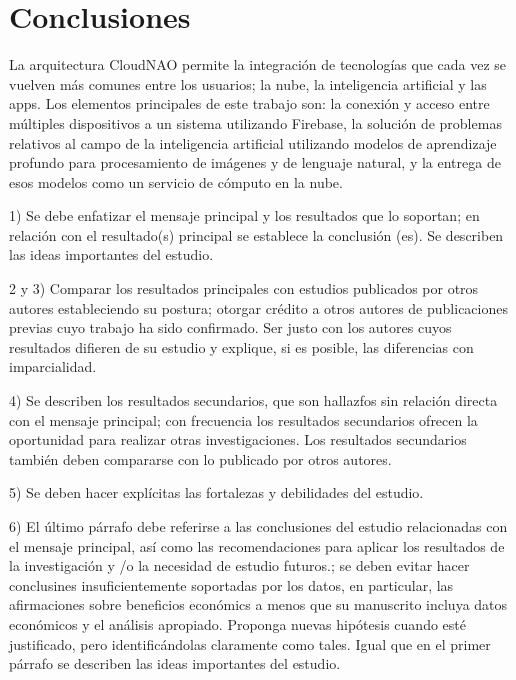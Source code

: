 \chapter*{Conclusiones}
\label{\detokenize{conclusion:cloudnao-una-arquitectura-de-software-para-la-integracion-de-computo-en-la-nube-con-robots-nao}}\label{\detokenize{conclusion:conclusion}}\label{\detokenize{conclusion::doc}}


La arquitectura CloudNAO permite
la integración de tecnologías que cada vez se vuelven
más comunes entre los usuarios; la nube, la inteligencia artificial
y las apps. 
Los elementos principales de este 
trabajo son: la conexión y acceso
entre múltiples dispositivos a un	 sistema
utilizando Firebase, la solución de problemas relativos al campo 
de la inteligencia artificial utilizando modelos
de aprendizaje profundo para procesamiento de imágenes y de lenguaje natural, 
y la entrega de esos modelos como un servicio de cómputo en la nube.



1) Se debe enfatizar el mensaje principal y los
resultados que lo soportan; en relación con el resultado(s) 
principal se establece la conclusión (es). Se describen
las ideas importantes del estudio.

2 y 3) Comparar los resultados principales  con estudios
publicados por otros autores estableciendo su postura;
otorgar crédito a otros autores de publicaciones previas cuyo trabajo
ha sido confirmado. Ser justo con los autores cuyos resultados difieren de
su estudio y explique, si es posible, las
diferencias con imparcialidad.

4) Se describen los resultados secundarios, que son hallazfos sin relación directa con el mensaje principal; con frecuencia los resultados
secundarios ofrecen la oportunidad para realizar otras investigaciones.
Los resultados secundarios también deben compararse con lo
publicado por otros autores.

5) Se deben hacer explícitas las fortalezas y debilidades del 
estudio.

6) El último párrafo debe referirse a las conclusiones 
del estudio relacionadas con el mensaje principal, así como 
las recomendaciones para aplicar los resultados de la investigación
y /o la necesidad de estudio futuros.; se deben evitar hacer conclusines
insuficientemente soportadas por los datos, en particular,
las afirmaciones sobre beneficios económics a menos que su 
manuscrito incluya datos económicos y el análisis apropiado.
Proponga nuevas hipótesis cuando esté justificado, pero identificándolas
claramente como tales. Igual que en el 
primer párrafo se describen las ideas importantes del estudio.